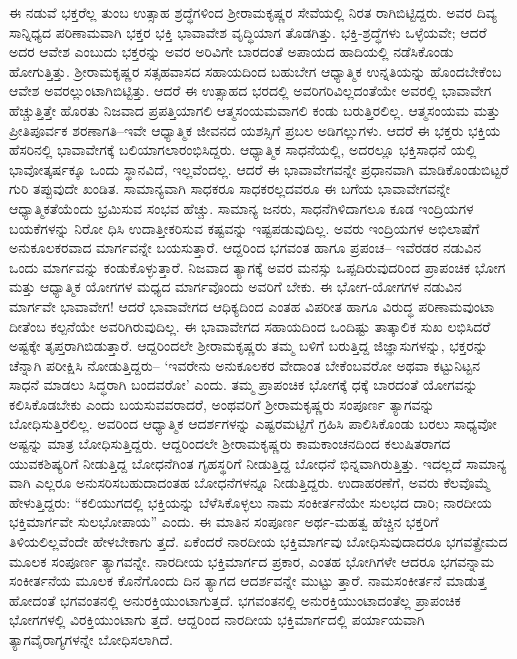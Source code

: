 ಈ ನಡುವೆ ಭಕ್ತರೆಲ್ಲ ತುಂಬ ಉತ್ಸಾಹ ಶ್ರದ್ಧೆಗಳಿಂದ ಶ್ರೀರಾಮಕೃಷ್ಣರ ಸೇವೆಯಲ್ಲಿ ನಿರತ ರಾಗಿಬಿಟ್ಟಿದ್ದರು. ಅವರ ದಿವ್ಯ ಸಾನ್ನಿಧ್ಯದ ಪರಿಣಾಮವಾಗಿ ಭಕ್ತರ ಭಕ್ತಿ ಭಾವಾವೇಶ ವೃದ್ಧಿಯಾಗ ತೊಡಗಿತ್ತು. ಭಕ್ತಿ-ಶ್ರದ್ಧೆಗಳು ಒಳ್ಳೆಯವೇ; ಆದರೆ ಅದರ ಆವೇಶ ಎಂಬುದು ಭಕ್ತರನ್ನು ಅವರ ಅರಿವಿಗೇ ಬಾರದಂತೆ ಅಪಾಯದ ಹಾದಿಯಲ್ಲಿ ನಡೆಸಿಕೊಂಡು ಹೋಗುತ್ತಿತ್ತು. ಶ್ರೀರಾಮಕೃಷ್ಣರ ಸತ್ಸಹವಾಸದ ಸಹಾಯದಿಂದ ಬಹುಬೇಗ ಆಧ್ಯಾತ್ಮಿಕ ಉನ್ನತಿಯನ್ನು ಹೊಂದಬೇಕೆಂಬ ಆವೇಶ ಅವರಲ್ಲುಂಟಾಗಿಬಿಟ್ಟಿತ್ತು. ಆದರೆ ಈ ಉತ್ಸಾಹದ ಭರದಲ್ಲಿ ಅವರಿಗರಿವಿಲ್ಲದಂತೆಯೇ ಅವರಲ್ಲಿ ಭಾವಾವೇಗ ಹೆಚ್ಚುತ್ತಿತ್ತೇ ಹೊರತು ನಿಜವಾದ ಪ್ರಪತ್ತಿಯಾಗಲಿ ಆತ್ಮಸಂಯಮವಾಗಲಿ ಕಂಡು ಬರುತ್ತಿರಲಿಲ್ಲ. ಆತ್ಮಸಂಯಮ ಮತ್ತು ಪ್ರೀತಿಪೂರ್ವಕ ಶರಣಾಗತಿ–ಇವೇ ಆಧ್ಯಾತ್ಮಿಕ ಜೀವನದ ಯಶಸ್ಸಿಗೆ ಪ್ರಬಲ ಅಡಿಗಲ್ಲುಗಳು. ಆದರೆ ಈ ಭಕ್ತರು ಭಕ್ತಿಯ ಹೆಸರಿನಲ್ಲಿ ಭಾವಾವೇಗಕ್ಕೆ ಬಲಿಯಾಗಲಾರಂಭಿಸಿದ್ದರು. ಆಧ್ಯಾತ್ಮಿಕ ಸಾಧನೆಯಲ್ಲಿ, ಅದರಲ್ಲೂ ಭಕ್ತಿಸಾಧನೆ ಯಲ್ಲಿ ಭಾವೋತ್ಕರ್ಷಕ್ಕೂ ಒಂದು ಸ್ಥಾನವಿದೆ, ಇಲ್ಲವೆಂದಲ್ಲ. ಆದರೆ ಈ ಭಾವಾವೇಗವನ್ನೇ ಪ್ರಧಾನವಾಗಿ ಮಾಡಿಕೊಂಡುಬಿಟ್ಟರೆ ಗುರಿ ತಪ್ಪುವುದೇ ಖಂಡಿತ. ಸಾಮಾನ್ಯವಾಗಿ ಸಾಧಕರೂ ಸಾಧಕರಲ್ಲದವರೂ ಈ ಬಗೆಯ ಭಾವಾವೇಗವನ್ನೇ ಆಧ್ಯಾತ್ಮಿಕತೆಯೆಂದು ಭ್ರಮಿಸುವ ಸಂಭವ ಹೆಚ್ಚು. ಸಾಮಾನ್ಯ ಜನರು, ಸಾಧನೆಗಿಳಿದಾಗಲೂ ಕೂಡ ಇಂದ್ರಿಯಗಳ ಬಯಕೆಗಳನ್ನು ನಿರೋ ಧಿಸಿ ಉದಾತ್ತೀಕರಿಸುವ ಕಷ್ಟವನ್ನು ಇಷ್ಟಪಡುವುದಿಲ್ಲ. ಅವರು ಇಂದ್ರಿಯಗಳ ಅಭಿಲಾಷೆಗೆ ಅನುಕೂಲಕರವಾದ ಮಾರ್ಗವನ್ನೇ ಬಯಸುತ್ತಾರೆ. ಆದ್ದರಿಂದ ಭಗವಂತ ಹಾಗೂ ಪ್ರಪಂಚ– ಇವೆರಡರ ನಡುವಿನ ಒಂದು ಮಾರ್ಗವನ್ನು ಕಂಡುಕೊಳ್ಳುತ್ತಾರೆ. ನಿಜವಾದ ತ್ಯಾಗಕ್ಕೆ ಅವರ ಮನಸ್ಸು ಒಪ್ಪದಿರುವುದರಿಂದ ಪ್ರಾಪಂಚಿಕ ಭೋಗ ಮತ್ತು ಆಧ್ಯಾತ್ಮಿಕ ಯೋಗಗಳ ಮಧ್ಯದ ಮಾರ್ಗವೊಂದು ಅವರಿಗೆ ಬೇಕು. ಈ ಭೋಗ-ಯೋಗಗಳ ನಡುವಿನ ಮಾರ್ಗವೇ ಭಾವಾವೇಗ! ಆದರೆ ಭಾವಾವೇಗದ ಆಧಿಕ್ಯದಿಂದ ಎಂತಹ ವಿಪರೀತ ಹಾಗೂ ವಿರುದ್ಧ ಪರಿಣಾಮವುಂಟಾ ದೀತೆಂಬ ಕಲ್ಪನೆಯೇ ಅವರಿಗಿರುವುದಿಲ್ಲ. ಈ ಭಾವಾವೇಗದ ಸಹಾಯದಿಂದ ಒಂದಿಷ್ಟು ತಾತ್ಕಾಲಿಕ ಸುಖ ಲಭಿಸಿದರೆ ಅಷ್ಟಕ್ಕೇ ತೃಪ್ತರಾಗಿಬಿಡುತ್ತಾರೆ. ಆದ್ದರಿಂದಲೇ ಶ್ರೀರಾಮಕೃಷ್ಣರು ತಮ್ಮ ಬಳಿಗೆ ಬರುತ್ತಿದ್ದ ಜಿಜ್ಞಾಸುಗಳನ್ನು, ಭಕ್ತರನ್ನು ಚೆನ್ನಾಗಿ ಪರೀಕ್ಷಿಸಿ ನೋಡುತ್ತಿದ್ದರು– ‘ಇವರೇನು ಅನುಕೂಲಕರ ವೇದಾಂತ ಬೇಕೆಂಬವರೋ ಅಥವಾ ಕಟ್ಟುನಿಟ್ಟನ ಸಾಧನೆ ಮಾಡಲು ಸಿದ್ಧರಾಗಿ ಬಂದವರೋ’ ಎಂದು. ತಮ್ಮ ಪ್ರಾಪಂಚಿಕ ಭೋಗಕ್ಕೆ ಧಕ್ಕೆ ಬಾರದಂತೆ ಯೋಗವನ್ನು ಕಲಿಸಿಕೊಡಬೇಕು ಎಂದು ಬಯಸುವವರಾದರೆ, ಅಂಥವರಿಗೆ ಶ್ರೀರಾಮಕೃಷ್ಣರು ಸಂಪೂರ್ಣ ತ್ಯಾಗವನ್ನು ಬೋಧಿಸುತ್ತಿರಲಿಲ್ಲ. ಅವರಿಂದ ಆಧ್ಯಾತ್ಮಿಕ ಆದರ್ಶಗಳನ್ನು ಎಷ್ಟರಮಟ್ಟಿಗೆ ಗ್ರಹಿಸಿ ಪಾಲಿಸಿಕೊಂಡು ಬರಲು ಸಾಧ್ಯವೋ ಅಷ್ಟನ್ನು ಮಾತ್ರ ಬೋಧಿಸುತ್ತಿದ್ದರು. ಆದ್ದರಿಂದಲೇ ಶ್ರೀರಾಮಕೃಷ್ಣರು ಕಾಮಕಾಂಚನದಿಂದ ಕಲುಷಿತರಾಗದ ಯುವಕಶಿಷ್ಯರಿಗೆ ನೀಡುತ್ತಿದ್ದ ಬೋಧನೆಗಿಂತ ಗೃಹಸ್ಥರಿಗೆ ನೀಡುತ್ತಿದ್ದ ಬೋಧನೆ ಭಿನ್ನವಾಗಿರುತ್ತಿತ್ತು. ಇದಲ್ಲದೆ ಸಾಮಾನ್ಯ ವಾಗಿ ಎಲ್ಲರೂ ಅನುಸರಿಸಬಹುದಾದಂತಹ ಬೋಧನೆಗಳನ್ನೂ ನೀಡುತ್ತಿದ್ದರು. ಉದಾಹರಣೆಗೆ, ಅವರು ಕೆಲವೊಮ್ಮೆ ಹೇಳುತ್ತಿದ್ದರು: “ಕಲಿಯುಗದಲ್ಲಿ ಭಕ್ತಿಯನ್ನು ಬೆಳೆಸಿಕೊಳ್ಳಲು ನಾಮ ಸಂಕೀರ್ತನೆಯೇ ಸುಲಭದ ದಾರಿ; ನಾರದೀಯ ಭಕ್ತಿಮಾರ್ಗವೇ ಸುಲಭೋಪಾಯ” ಎಂದು. ಈ ಮಾತಿನ ಸಂಪೂರ್ಣ ಅರ್ಥ-ಮಹತ್ವ ಹೆಚ್ಚಿನ ಭಕ್ತರಿಗೆ ತಿಳಿಯಲಿಲ್ಲವೆಂದೇ ಹೇಳಬೇಕಾಗು ತ್ತದೆ. ಏಕೆಂದರೆ ನಾರದೀಯ ಭಕ್ತಿಮಾರ್ಗವು ಬೋಧಿಸುವುದಾದರೂ ಭಗವತ್ಪ್ರೇಮದ ಮೂಲಕ ಸಂಪೂರ್ಣ ತ್ಯಾಗವನ್ನೇ. ನಾರದೀಯ ಭಕ್ತಿಮಾರ್ಗದ ಪ್ರಕಾರ, ಎಂತಹ ಭೋಗಿಗಳೇ ಆದರೂ ಭಗವನ್ನಾಮ ಸಂಕೀರ್ತನೆಯ ಮೂಲಕ ಕೊನೆಗೊಂದು ದಿನ ತ್ಯಾಗದ ಆದರ್ಶವನ್ನೇ ಮುಟ್ಟು ತ್ತಾರೆ. ನಾಮಸಂಕೀರ್ತನೆ ಮಾಡುತ್ತ ಹೋದಂತೆ ಭಗವಂತನಲ್ಲಿ ಅನುರಕ್ತಿಯುಂಟಾಗುತ್ತದೆ. ಭಗವಂತನಲ್ಲಿ ಅನುರಕ್ತಿಯುಂಟಾದಂತೆಲ್ಲ ಪ್ರಾಪಂಚಿಕ ಭೋಗಗಳಲ್ಲಿ ವಿರಕ್ತಿಯುಂಟಾಗು ತ್ತದೆ. ಆದ್ದರಿಂದ ನಾರದೀಯ ಭಕ್ತಿಮಾರ್ಗದಲ್ಲಿ ಪರ್ಯಾಯವಾಗಿ ತ್ಯಾಗವೈರಾಗ್ಯಗಳನ್ನೇ ಬೋಧಿಸಲಾಗಿದೆ.

